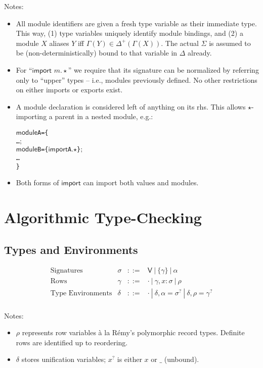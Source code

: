 \documentclass[10pt,a4paper]{article}
\newcommand\y[1]{\ensuremath{\mathsf{#1}}\xspace}
\newcommand\K[1]{\ensuremath{\textsf{#1}}}
\newenvironment{code}{%
  \begin{alltt}%
  \small\sffamily
}{
  \end{alltt}%
}
\newcommand\note[1]{\noindent #1}
\begin{document}
\note{
Notes:\\[-1.5\baselineskip]
\begin{itemize}
\item All module identifiers are given a fresh type variable as their immediate type. This way, (1) type variables uniquely identify module bindings, and (2) a module $X$ aliases $Y$ iff $\Gamma(Y) \in \Delta^+(\Gamma(X))$. The actual $\Sigma$ is assumed to be (non-deterministically) bound to that variable in $\Delta$ already.
\item For ``\K{import} $m\K.{\star}$'' we require that its signature can be normalized by referring only to ``upper'' types -- i.e., modules previously defined.
No other restrictions on either imports or exports exist.
\item A module declaration is considered left of anything on its rhs. This allows $\star$-importing a parent in a nested module, e.g.:
\begin{code}
\K{module} A = \{
  \dots\K;
  \K{module} B = \{ \K{import} A\K.${\star}$ \}\K;
  \dots
\}
\end{code}
\item Both forms of \K{import} can import both values and modules.
\end{itemize}
}


\clearpage
\section{Algorithmic Type-Checking}

\subsection*{Types and Environments}
$$
\begin{array}{lrcl}
\mbox{Signatures} & \sigma &::=& \y{V} ~|~ \{\gamma\} ~|~ \alpha \\
\mbox{Rows} & \gamma &::=& {\cdot} ~|~ \gamma,x{:}\sigma ~|~ \rho \\
\mbox{Type Environments} & \delta &::=& {\cdot} ~|~ \delta,\alpha{=}\sigma^? ~|~ \delta,\rho{=}\gamma^? \\
\end{array}
$$

\note{
Notes:
~\\[-1.5\baselineskip]
\begin{itemize}
\item $\rho$ represents row variables \`a la R\'emy's polymorphic record types. Definite rows are identified up to reordering.
\item $\delta$ stores unification variables; $x^?$ is either $x$ or $\_$ (unbound).
\end{itemize}
}
\end{document}
